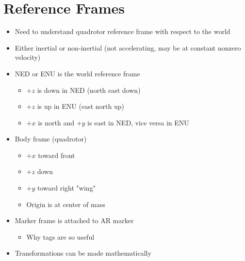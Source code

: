 \documentclass{article}
\begin{document}
\section*{Reference Frames}
\begin{itemize}
\item Need to understand quadrotor reference frame with respect to the world
\item Either inertial or non-inertial (not accelerating, may be at constant nonzero velocity)
\item NED or ENU is the world reference frame
\begin{itemize}
\item $+z$ is down in NED (north east down)
\item $+z$ is up in ENU (east north up)
\item $+x$ is north and $+y$ is east in NED,  vice versa in ENU
\end{itemize}
\item Body frame (quadrotor)
\begin{itemize}
\item $+x$ toward front
\item $+z$ down
\item $+y$ toward right "wing"
\item Origin is at center of mass
\end{itemize}
\item Marker frame is attached to AR marker
\begin{itemize}
\item Why tags are so useful
\end{itemize}
\item Transformations can be made mathematically
\end{itemize}
\end{document}
